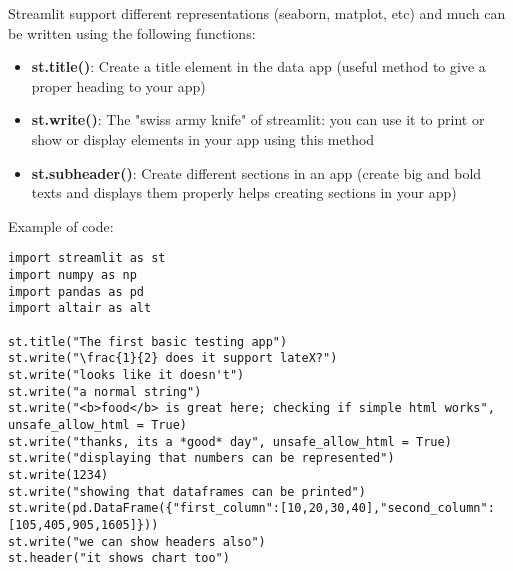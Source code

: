 \documentclass{beamer}[10pt, usepdftitle=false handout]
\begin{document}
\begin{frame}
Streamlit support different representations (seaborn, matplot, etc) and much can be written using the following functions:
\vspace*{0.6em}

\begin{itemize}
\item{\textbf{st.title()}: 
Create a title element in the data app (useful method to give a proper heading to your app)}
\item{\textbf{st.write()}:
The "swiss army knife" of streamlit: you can use it to print or show or display elements in your app using this method}
\item{\textbf{st.subheader()}:
Create different sections in an app (create big and bold texts and displays them properly helps creating sections in your app)}
\end{itemize}


\end{frame}
\begin{frame}[fragile]

Example of code:
\vspace*{0.6em}

\begingroup
\fontsize{6pt}{8pt}\selectfont
\begin{verbatim}
import streamlit as st
import numpy as np
import pandas as pd
import altair as alt

st.title("The first basic testing app")
st.write("\frac{1}{2} does it support lateX?")
st.write("looks like it doesn't")
st.write("a normal string")
st.write("<b>food</b> is great here; checking if simple html works", unsafe_allow_html = True)
st.write("thanks, its a *good* day", unsafe_allow_html = True)
st.write("displaying that numbers can be represented")
st.write(1234)
st.write("showing that dataframes can be printed")
st.write(pd.DataFrame({"first_column":[10,20,30,40],"second_column":[105,405,905,1605]}))
st.write("we can show headers also")
st.header("it shows chart too")

\end{verbatim}
\endgroup

\end{frame}
\end{document}

